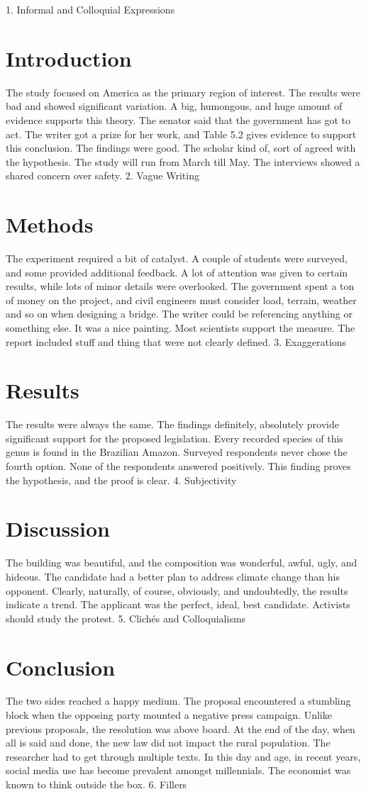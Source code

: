 1. Informal and Colloquial Expressions
\section{Introduction}
The study focused on America as the primary region of interest. The results were bad and showed significant variation. A big, humongous, and huge amount of evidence supports this theory. The senator said that the government has got to act. The writer got a prize for her work, and Table 5.2 gives evidence to support this conclusion. The findings were good. The scholar kind of, sort of agreed with the hypothesis. The study will run from March till May. The interviews showed a shared concern over safety.
2. Vague Writing
\section{Methods}
The experiment required a bit of catalyst. A couple of students were surveyed, and some provided additional feedback. A lot of attention was given to certain results, while lots of minor details were overlooked. The government spent a ton of money on the project, and civil engineers must consider load, terrain, weather and so on when designing a bridge. The writer could be referencing anything or something else. It was a nice painting. Most scientists support the measure. The report included stuff and thing that were not clearly defined.
3. Exaggerations
\section{Results}
The results were always the same. The findings definitely, absolutely provide significant support for the proposed legislation. Every recorded species of this genus is found in the Brazilian Amazon. Surveyed respondents never chose the fourth option. None of the respondents answered positively. This finding proves the hypothesis, and the proof is clear.
4. Subjectivity
\section{Discussion}
The building was beautiful, and the composition was wonderful, awful, ugly, and hideous. The candidate had a better plan to address climate change than his opponent. Clearly, naturally, of course, obviously, and undoubtedly, the results indicate a trend. The applicant was the perfect, ideal, best candidate. Activists should study the protest.
5. Clichés and Colloquialisms
\section{Conclusion}
The two sides reached a happy medium. The proposal encountered a stumbling block when the opposing party mounted a negative press campaign. Unlike previous proposals, the resolution was above board. At the end of the day, when all is said and done, the new law did not impact the rural population. The researcher had to get through multiple texts. In this day and age, in recent years, social media use has become prevalent amongst millennials. The economist was known to think outside the box.
6. Fillers
